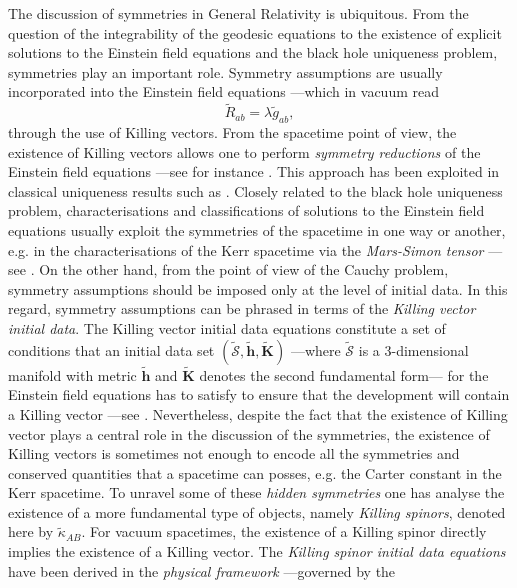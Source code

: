 \documentclass[10pt,a4paper]{article}
\theoremstyle{plain}
\def\bmh{{\bm h}}
\def\bmK{{\bm K}}
\begin{document}
   
The discussion of symmetries  in General
Relativity is ubiquitous. From the question of the integrability of the geodesic
equations to the existence of explicit solutions to the Einstein field
equations and the black hole uniqueness problem, symmetries play an important role.   
Symmetry assumptions are usually incorporated into
 the Einstein field equations ---which in vacuum read
\begin{equation}
\tilde{R}_{ab}=\lambda \tilde{g}_{ab},
\label{EFEVacuum}
\end{equation} 
 through the use of Killing vectors.  From the spacetime point of
 view, the existence of Killing vectors allows one to perform
 \emph{symmetry reductions} of the Einstein field equations ---see for
 instance \cite{Wei90a}. This approach has been exploited in classical
 uniqueness results such as \cite{Rob75b}.  Closely related to the
 black hole uniqueness problem, characterisations and classifications
 of solutions to the Einstein field equations usually exploit the
 symmetries of the spacetime in one way or another, e.g. in the
 characterisations of the Kerr spacetime via the \emph{Mars-Simon
 tensor} ---see \cite{Mar99,Mar00,Sim84}.  On the other hand, from the
 point of view of the Cauchy problem, symmetry assumptions should be
 imposed only at the level of initial data. In this regard, symmetry
 assumptions can be phrased in terms of the \emph{Killing vector
 initial data}.  The Killing vector initial data equations constitute
 a set of conditions that an initial data set
 $(\tilde{\mathcal{S}},\tilde{\bmh},\tilde{\bmK})$ ---where
 $\tilde{\mathcal{S}}$ is a 3-dimensional manifold with metric
 $\tilde{\bmh}$ and $\tilde{\bmK}$ denotes the second fundamental
 form--- for the Einstein field equations has to satisfy to ensure
 that the development will contain a Killing vector ---see
 \cite{BeiChr97b}.  Nevertheless, despite the fact that the existence
 of Killing vector plays a central role in the discussion of the
 symmetries, the existence of Killing vectors is sometimes not enough
 to encode all the symmetries and conserved quantities that a
 spacetime can posses, e.g. the Carter constant in the Kerr
 spacetime. To unravel some of these \emph{hidden symmetries} one has
 analyse the existence of a more fundamental type of objects, namely
 \emph{Killing spinors}, denoted here by $\tilde{\kappa}_{AB}$. For vacuum spacetimes,
 the existence of a Killing spinor directly implies the existence of a
 Killing vector. The \emph{Killing spinor initial data equations} have
 been derived in the \emph{physical framework} ---governed by the
\end{document}
